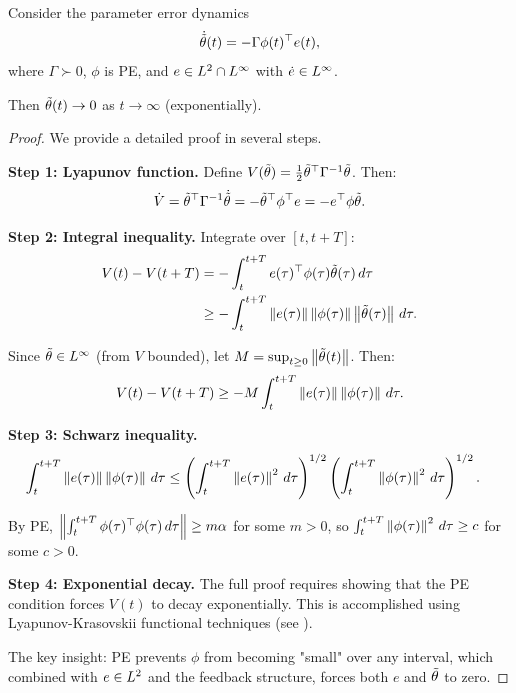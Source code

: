 \begin{theorem}
\label{thm:pe_convergence}
Consider the parameter error dynamics
\begin{equation}
    \dot{\tilde{\theta}}(t) = -\Gamma \phi(t)^\top e(t),
\end{equation}
where $\Gamma \succ 0$, $\phi$ is PE, and $e \in L^{2} \cap L^{\infty}$ with $\dot{e} \in L^{\infty}$.

Then $\tilde{\theta}(t) \to 0$ as $t \to \infty$ (exponentially).
\end{theorem}

\begin{proof}
We provide a detailed proof in several steps.

\textbf{Step 1: Lyapunov function.}
Define $V(\tilde{\theta}) = \frac{1}{2} \tilde{\theta}^\top \Gamma^{-1} \tilde{\theta}$. Then:
\begin{equation}
    \dot{V} = \tilde{\theta}^\top \Gamma^{-1} \dot{\tilde{\theta}} = -\tilde{\theta}^\top \phi^\top e = -e^\top \phi \tilde{\theta}.
\end{equation}

\textbf{Step 2: Integral inequality.}
Integrate over $[t, t+T]$:
\begin{align}
    V(t) - V(t+T) &= -\int_t^{t+T} e(\tau)^\top \phi(\tau) \tilde{\theta}(\tau) \, d\tau \\
    &\geq -\int_t^{t+T} \left\| e(\tau) \right\| \left\| \phi(\tau) \right\| \left\| \tilde{\theta}(\tau) \right\| \, d\tau.
\end{align}

Since $\tilde{\theta} \in L^{\infty}$ (from $V$ bounded), let $M = \sup_{t \geq 0} \left\| \tilde{\theta}(t) \right\|$. Then:
\begin{equation}
    V(t) - V(t+T) \geq -M \int_t^{t+T} \left\| e(\tau) \right\| \left\| \phi(\tau) \right\| \, d\tau.
\end{equation}

\textbf{Step 3: Schwarz inequality.}
\begin{align}
    \int_t^{t+T} \left\| e(\tau) \right\| \left\| \phi(\tau) \right\| \, d\tau &\leq \left( \int_t^{t+T} \left\| e(\tau) \right\|^2 \, d\tau \right)^{1/2} \left( \int_t^{t+T} \left\| \phi(\tau) \right\|^2 \, d\tau \right)^{1/2}.
\end{align}

By PE, $\left\| \int_t^{t+T} \phi(\tau)^\top \phi(\tau) \, d\tau \right\| \geq m\alpha$ for some $m > 0$, so $\int_t^{t+T} \left\| \phi(\tau) \right\|^2 \, d\tau \geq c$ for some $c > 0$.

\textbf{Step 4: Exponential decay.}
The full proof requires showing that the PE condition forces $V(t)$ to decay exponentially. This is accomplished using Lyapunov-Krasovskii functional techniques (see \cite{Ioannou2006, Narendra1989}).

The key insight: PE prevents $\phi$ from becoming "small" over any interval, which combined with $e \in L^{2}$ and the feedback structure, forces both $e$ and $\tilde{\theta}$ to zero.
\end{proof}

